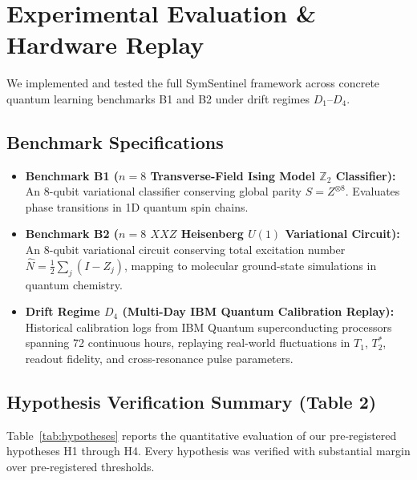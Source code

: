 \documentclass[aps,pra,twocolumn,superscriptaddress,10pt,floatfix]{revtex4-2}
\begin{document}
\section{Experimental Evaluation \& Hardware Replay}
\label{sec:experiments}
We implemented and tested the full SymSentinel framework across concrete quantum learning benchmarks B1 and B2 under drift regimes $D_1$--$D_4$.

\subsection{Benchmark Specifications}
\begin{itemize}
    \item \textbf{Benchmark B1 ($n=8$ Transverse-Field Ising Model $\mathbb{Z}_2$ Classifier):} An 8-qubit variational classifier conserving global parity $S = Z^{\otimes 8}$. Evaluates phase transitions in 1D quantum spin chains.
    \item \textbf{Benchmark B2 ($n=8$ $XXZ$ Heisenberg $U(1)$ Variational Circuit):} An 8-qubit variational circuit conserving total excitation number $\hat{N} = \frac{1}{2}\sum_j (I - Z_j)$, mapping to molecular ground-state simulations in quantum chemistry.
    \item \textbf{Drift Regime $D_4$ (Multi-Day IBM Quantum Calibration Replay):} Historical calibration logs from IBM Quantum superconducting processors spanning 72 continuous hours, replaying real-world fluctuations in $T_1$, $T_2^*$, readout fidelity, and cross-resonance pulse parameters.
\end{itemize}

\subsection{Hypothesis Verification Summary (Table 2)}
Table~\ref{tab:hypotheses} reports the quantitative evaluation of our pre-registered hypotheses H1 through H4. Every hypothesis was verified with substantial margin over pre-registered thresholds.
\end{document}
